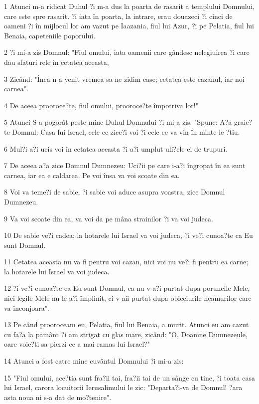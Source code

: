 \par 1 Atunci m-a ridicat Duhul ?i m-a dus la poarta de rasarit a templului Domnului, care este spre rasarit. ?i iata în poarta, la intrare, erau douazeci ?i cinci de oameni ?i în mijlocul lor am vazut pe Iaazania, fiul lui Azur, ?i pe Pelatia, fiul lui Benaia, capeteniile poporului.
\par 2 ?i mi-a zis Domnul: "Fiul omului, iata oamenii care gândesc nelegiuirea ?i care dau sfaturi rele în cetatea aceasta,
\par 3 Zicând: "Înca n-a venit vremea sa ne zidim case; cetatea este cazanul, iar noi carnea".
\par 4 De aceea prooroce?te, fiul omului, prooroce?te împotriva lor!"
\par 5 Atunci S-a pogorât peste mine Duhul Domnului ?i mi-a zis: "Spune: A?a graie?te Domnul: Casa lui Israel, cele ce zice?i voi ?i cele ce va vin în minte le ?tiu.
\par 6 Mul?i a?i ucis voi în cetatea aceasta ?i a?i umplut uli?ele ei de trupuri.
\par 7 De aceea a?a zice Domnul Dumnezeu: Uci?ii pe care i-a?i îngropat în ea sunt carnea, iar ea e caldarea. Pe voi însa va voi scoate din ea.
\par 8 Voi va teme?i de sabie, ?i sabie voi aduce asupra voastra, zice Domnul Dumnezeu.
\par 9 Va voi scoate din ea, va voi da pe mâna strainilor ?i va voi judeca.
\par 10 De sabie ve?i cadea; la hotarele lui Israel va voi judeca, ?i ve?i cunoa?te ca Eu sunt Domnul.
\par 11 Cetatea aceasta nu va fi pentru voi cazan, nici voi nu ve?i fi pentru ea carne; la hotarele lui Israel va voi judeca.
\par 12 ?i ve?i cunoa?te ca Eu sunt Domnul, ca nu v-a?i purtat dupa poruncile Mele, nici legile Mele nu le-a?i împlinit, ci v-aii purtat dupa obiceiurile neamurilor care va înconjoara".
\par 13 Pe când prooroceam eu, Pelatia, fiul lui Benaia, a murit. Atunci eu am cazut cu fa?a la pamânt ?i am strigat cu glas mare, zicând: "O, Doamne Dumnezeule, oare voie?ti sa pierzi ce a mai ramas lui Israel?"
\par 14 Atunci a fost catre mine cuvântul Domnului ?i mi-a zis:
\par 15 "Fiul omului, ace?tia sunt fra?ii tai, fra?ii tai de un sânge cu tine, ?i toata casa lui Israel, carora locuitorii Ierusalimului le zic: "Departa?i-va de Domnul! ?ara asta noua ni s-a dat de mo?tenire".
